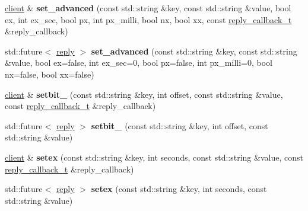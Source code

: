 \begin{DoxyCompactItemize}
\mbox{\label{classcpp__redis_1_1client_a60db35e46bcbe36e5264ee04933162fd}} 
\hyperlink{classcpp__redis_1_1client}{client} \& {\bfseries set\+\_\+advanced} (const std\+::string \&key, const std\+::string \&value, bool ex, int ex\+\_\+sec, bool px, int px\+\_\+milli, bool nx, bool xx, const \hyperlink{classcpp__redis_1_1client_a061a1140d36d2eaeda82b09a0bb3f9f2}{reply\+\_\+callback\+\_\+t} \&reply\+\_\+callback)
\item 
\mbox{\label{classcpp__redis_1_1client_a208688fdc336009701256722ef7e2a2b}} 
std\+::future$<$ \hyperlink{classcpp__redis_1_1reply}{reply} $>$ {\bfseries set\+\_\+advanced} (const std\+::string \&key, const std\+::string \&value, bool ex=false, int ex\+\_\+sec=0, bool px=false, int px\+\_\+milli=0, bool nx=false, bool xx=false)
\item 
\mbox{\label{classcpp__redis_1_1client_a17ecd647ae2e9f11e331d1254a21e0d3}} 
\hyperlink{classcpp__redis_1_1client}{client} \& {\bfseries setbit\+\_\+} (const std\+::string \&key, int offset, const std\+::string \&value, const \hyperlink{classcpp__redis_1_1client_a061a1140d36d2eaeda82b09a0bb3f9f2}{reply\+\_\+callback\+\_\+t} \&reply\+\_\+callback)
\item 
\mbox{\label{classcpp__redis_1_1client_abbf3233f6c395c5d4bdf7810c80e6c05}} 
std\+::future$<$ \hyperlink{classcpp__redis_1_1reply}{reply} $>$ {\bfseries setbit\+\_\+} (const std\+::string \&key, int offset, const std\+::string \&value)
\item 
\mbox{\label{classcpp__redis_1_1client_a9c82e27a54dc86febda83f34142ea402}} 
\hyperlink{classcpp__redis_1_1client}{client} \& {\bfseries setex} (const std\+::string \&key, int seconds, const std\+::string \&value, const \hyperlink{classcpp__redis_1_1client_a061a1140d36d2eaeda82b09a0bb3f9f2}{reply\+\_\+callback\+\_\+t} \&reply\+\_\+callback)
\item 
\mbox{\label{classcpp__redis_1_1client_a14f1f1c9f50437585a8e758d1a004a67}} 
std\+::future$<$ \hyperlink{classcpp__redis_1_1reply}{reply} $>$ {\bfseries setex} (const std\+::string \&key, int seconds, const std\+::string \&value)
\item 

\end{DoxyCompactItemize}
